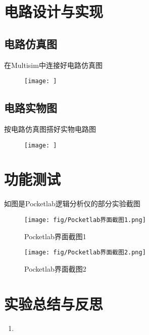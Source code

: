 \documentclass{ctexart}
\begin{document}
\section{电路设计与实现}
\subsection{电路仿真图}
在Multisim中连接好电路仿真图
\begin{figure}[H]
    \centering
    \texttt{[image: ]}
    \caption{}
    \label{}
\end{figure}

\subsection{电路实物图}
按电路仿真图搭好实物电路图
\begin{figure}[H]
    \centering
    \texttt{[image: ]}
    \caption{}
    \label{}
\end{figure}
\section{功能测试}
如图是Pocketlab逻辑分析仪的部分实验截图
\begin{figure}[H]
    \centering
    \texttt{[image: fig/Pocketlab界面截图1.png]}
    \caption{Pocketlab界面截图1}
    \label{Pocketlab界面截图1}
\end{figure}
\begin{figure}[H]
    \centering
    \texttt{[image: fig/Pocketlab界面截图2.png]}
    \caption{Pocketlab界面截图2}
    \label{Pocketlab界面截图2}
\end{figure}
\section{实验总结与反思}
\begin{enumerate}
    \item 
\end{enumerate}
\end{document}
